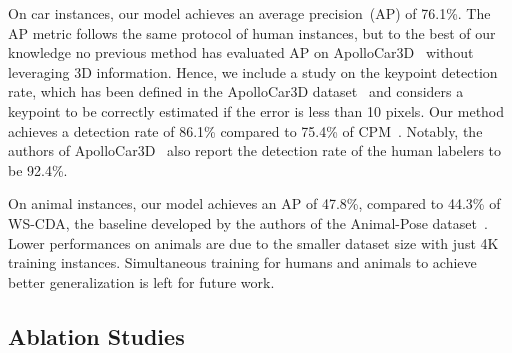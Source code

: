 \documentclass[journal]{IEEEtran}
\begin{document}
On car instances, our model achieves an average precision~(AP) of 76.1\%.
The AP metric follows the same protocol of human instances,  but to the best
of our knowledge no previous method has evaluated AP on
ApolloCar3D~\cite{song2019apollocar3d} without leveraging 3D information.
Hence, we include a study on the keypoint detection rate, which has been defined
in the ApolloCar3D dataset~\cite{song2019apollocar3d} and considers a keypoint to
be correctly estimated if the error is less than 10 pixels. Our method achieves
a detection rate of 86.1\% compared to 75.4\% of CPM~\cite{wei2016convolutional}.
Notably, the authors of ApolloCar3D~\cite{song2019apollocar3d} also report the
detection rate of the human labelers to be 92.4\%.

On animal instances, our model achieves an AP of 47.8\%, compared to 44.3\% of
WS-CDA, the baseline developed by the authors of the Animal-Pose
dataset~\cite{cao2019cross}.  Lower performances on animals are due to the
smaller dataset size with just 4K training instances. Simultaneous training for
humans and animals to achieve better generalization is left for future work.





\subsection{Ablation Studies}
\end{document}
